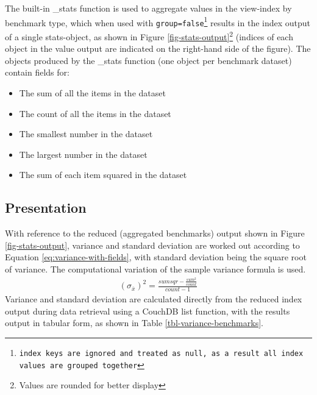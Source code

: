 The built-in \_stats function is used to aggregate values in the view-index by benchmark type, which when used with \texttt{group=false\footnote{index keys are ignored and treated as \texttt{null}, as a result all index values are grouped together}} results in the index output of a single stats-object, as shown in Figure \ref{fig-stats-output}\footnote{Values are rounded for better display} (indices of each object in the value output are indicated on the right-hand side of the figure). The objects produced by the \_stats function (one object per benchmark dataset) contain fields for:

\begin{itemize}
    \item The sum of all the items in the dataset
    \item The count of all the items in the dataset
    \item The smallest number in the dataset
    \item The largest number in the dataset
    \item The sum of each item squared in the dataset
\end{itemize}



\subsection{Presentation}
With reference to the reduced (aggregated benchmarks) output shown in Figure \ref{fig-stats-output}, variance and standard deviation are worked out according to Equation \ref{eq:variance-with-fields}, with standard deviation being the square root of variance. The computational variation of the sample variance formula is used.
\begin{align}
    (\sigma_{\overline{x}})^{2} =  \frac{sumsqr - \frac{sum^2}{count}}{count - 1}\label{eq:variance-with-fields}
\end{align}
Variance and standard deviation are calculated directly from the reduced index output during data retrieval using a CouchDB list function, with the results output in tabular form, as shown in Table \ref{tbl-variance-benchmarks}.